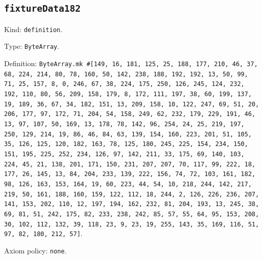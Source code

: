 \documentclass[11pt]{article}
\begin{document}
\subsection*{\texttt{fixtureData182}}
\noindent Kind: \texttt{definition}.\par
\noindent Type: \texttt{ByteArray}.\par
\noindent Definition: \texttt{ByteArray.mk \#[149, 16, 181, 125, 25, 188, 177, 210, 46, 37, 68, 224, 214, 80, 78, 160, 50, 142, 238, 188, 192, 192, 13, 50, 99, 71, 25, 157, 8, 0, 246, 67, 38, 224, 175, 250, 126, 245, 124, 232, 192, 110, 80, 56, 209, 158, 179, 8, 172, 111, 197, 38, 60, 199, 137, 19, 189, 36, 67, 34, 182, 151, 13, 209, 158, 10, 122, 247, 69, 51, 20, 206, 177, 97, 172, 71, 204, 54, 158, 249, 62, 232, 179, 229, 191, 46, 13, 97, 107, 50, 169, 13, 178, 78, 142, 96, 254, 24, 25, 219, 197, 250, 129, 214, 19, 86, 46, 84, 63, 139, 154, 160, 223, 201, 51, 105, 35, 126, 125, 120, 182, 163, 78, 125, 180, 245, 225, 154, 234, 150, 151, 195, 225, 252, 234, 126, 97, 142, 211, 33, 175, 69, 140, 103, 224, 45, 21, 138, 201, 171, 150, 231, 207, 207, 70, 117, 99, 222, 18, 177, 26, 145, 13, 84, 204, 233, 139, 222, 156, 74, 72, 103, 161, 182, 98, 126, 163, 153, 164, 19, 60, 223, 44, 54, 10, 218, 244, 142, 217, 219, 50, 161, 188, 160, 159, 122, 112, 18, 244, 2, 126, 226, 236, 207, 141, 153, 202, 110, 12, 197, 194, 162, 232, 81, 204, 193, 13, 245, 38, 69, 81, 51, 242, 175, 82, 233, 238, 242, 85, 57, 55, 64, 95, 153, 208, 30, 102, 112, 132, 39, 118, 23, 9, 23, 19, 255, 143, 35, 169, 116, 51, 97, 82, 180, 212, 57]}.\par
\noindent Axiom policy: \texttt{none}.\par
\end{document}
